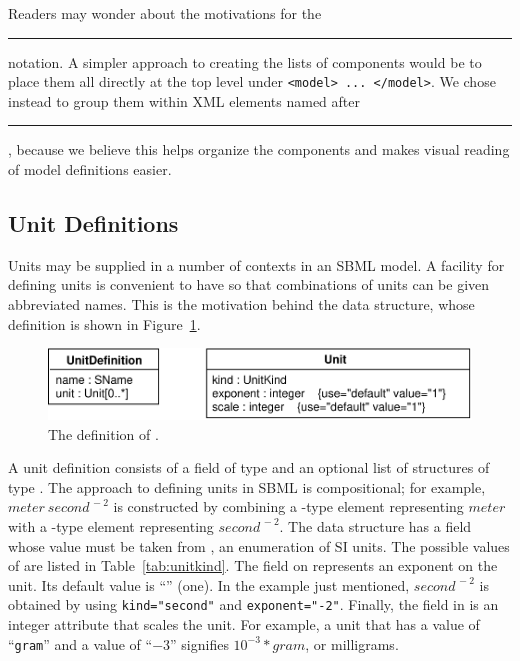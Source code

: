\documentclass[10pt]{cekarticle}
\newcommand{\vref}[1]{\ref{#1}}
\begin{document}
Readers may wonder about the motivations for the
\rule{0.5in}{0.5pt} notation.  A simpler approach to
creating the lists of components would be to place them all directly
at the top level under \texttt{<model> ... </model>}.  We chose instead to
group them within XML elements named after
\rule{0.5in}{0.5pt}, because we believe this helps
organize the components and makes visual reading of model definitions
easier.


\subsection{Unit Definitions}
\label{sec:unitdefinitions}

Units may be supplied in a number of contexts in an SBML model.  A facility
for defining units is convenient to have so that combinations of units can
be given abbreviated names.  This is the motivation behind the
 data structure, whose definition is shown in
Figure~\vref{fig:unitdefinition}.

\begin{figure}[htb]
  \centering
  \includegraphics[scale = 0.68]{unitdefinition}
  \caption{The definition of .}
  \label{fig:unitdefinition}
\end{figure}

A unit definition consists of a  field of type 
and an optional list of structures of type .  The approach to
defining units in SBML is compositional; for example, $meter\ 
second^{\,-2}$ is constructed by combining a -type element
representing $meter$ with a -type element representing
$second^{\,-2}$.  The \class{Unit} data structure has a  field
whose value must be taken from , an enumeration of SI
units.  The possible values of \class{UnitKind} are listed in
Table~\vref{tab:unitkind}.  The  field on 
represents an exponent on the unit.  Its default value is
``'' (one).  In the example just mentioned, $second^{\,-2}$
is obtained by using \texttt{kind="second"} and \texttt{exponent="-2"}.
Finally, the \attrib{scale} field in \class{Unit} is an integer attribute
that scales the unit.  For example, a unit that has a \attrib{kind} value
of ``\texttt{gram}'' and a \attrib{scale} value of ``\texttt{$-3$}''
signifies $10^{-3} * gram$, or milligrams.
\end{document}
